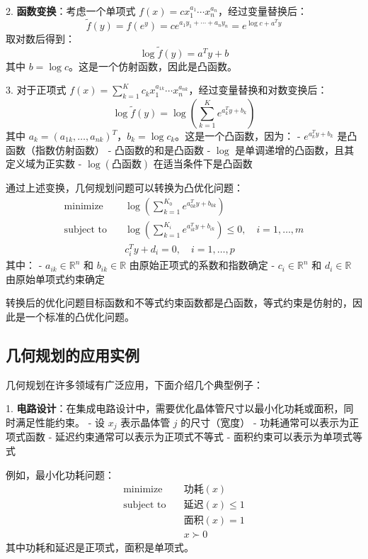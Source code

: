 \documentclass[12pt,a4paper]{book}
\begin{document}
2. \textbf{函数变换}：考虑一个单项式 $f(x) = c x_1^{a_1} \cdots x_n^{a_n}$，经过变量替换后：
   $$
   \tilde{f}(y) = f(e^y) = c e^{a_1 y_1 + \cdots + a_n y_n} = e^{\log c + a^T y}
   $$
   取对数后得到：
   $$
   \log \tilde{f}(y) = a^T y + b
   $$
   其中 $b = \log c$。这是一个仿射函数，因此是凸函数。

3. 对于正项式 $f(x) = \sum_{k=1}^K c_k x_1^{a_{1k}} \cdots x_n^{a_{nk}}$，经过变量替换和对数变换后：
   $$
   \log \tilde{f}(y) = \log \left( \sum_{k=1}^K e^{a_k^T y + b_k} \right)
   $$
   其中 $a_k = (a_{1k}, \dots, a_{nk})^T$，$b_k = \log c_k$。这是一个凸函数，因为：
   - $e^{a_k^T y + b_k}$ 是凸函数（指数仿射函数）
   - 凸函数的和是凸函数
   - $\log$ 是单调递增的凸函数，且其定义域为正实数
   - $\log(\text{凸函数})$ 在适当条件下是凸函数

通过上述变换，几何规划问题可以转换为凸优化问题：
$$
\begin{aligned}
\text{minimize} \quad & \log \left( \sum_{k=1}^{K_0} e^{a_{0k}^T y + b_{0k}} \right) \\
\text{subject to} \quad & \log \left( \sum_{k=1}^{K_i} e^{a_{ik}^T y + b_{ik}} \right) \leq 0, \quad i = 1, \dots, m \\
& c_i^T y + d_i = 0, \quad i = 1, \dots, p
\end{aligned}
$$
其中：
- $a_{ik} \in \mathbb{R}^n$ 和 $b_{ik} \in \mathbb{R}$ 由原始正项式的系数和指数确定
- $c_i \in \mathbb{R}^n$ 和 $d_i \in \mathbb{R}$ 由原始单项式约束确定

转换后的优化问题目标函数和不等式约束函数都是凸函数，等式约束是仿射的，因此是一个标准的凸优化问题。

\subsection{几何规划的应用实例}

几何规划在许多领域有广泛应用，下面介绍几个典型例子：

1. \textbf{电路设计}：在集成电路设计中，需要优化晶体管尺寸以最小化功耗或面积，同时满足性能约束。
   - 设 $x_j$ 表示晶体管 $j$ 的尺寸（宽度）
   - 功耗通常可以表示为正项式函数
   - 延迟约束通常可以表示为正项式不等式
   - 面积约束可以表示为单项式等式

   例如，最小化功耗问题：
   $$
   \begin{aligned}
   \text{minimize} \quad & \text{功耗}(x) \\
   \text{subject to} \quad & \text{延迟}(x) \leq 1 \\
   & \text{面积}(x) = 1 \\
   & x \succ 0
   \end{aligned}
   $$
   其中功耗和延迟是正项式，面积是单项式。
\end{document}
